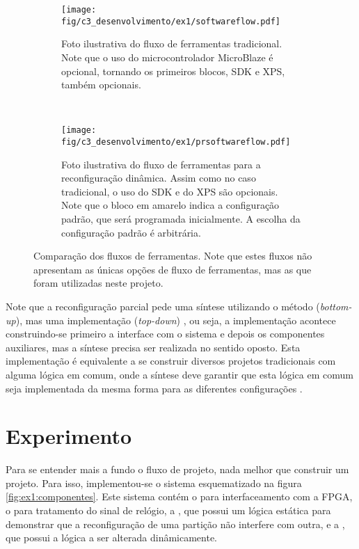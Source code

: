 \documentclass[11pt,a4paper,oneside]{book}
\begin{document}
\begin{figure}[h]
	\centering
       	\begin{subfigure}[b]{\textwidth}
       		\centering
		\texttt{[image: fig/c3\_desenvolvimento/ex1/softwareflow.pdf]}
		\caption{Foto ilustrativa do fluxo de ferramentas tradicional. Note que o uso do microcontrolador MicroBlaze é opcional, tornando os primeiros blocos, SDK e XPS, também opcionais.}
		\label{fig:ex1:softwareflow}
	\end{subfigure}\\
	\begin{subfigure}[b]{\textwidth}
		\centering
		\texttt{[image: fig/c3\_desenvolvimento/ex1/prsoftwareflow.pdf]}
		\caption{Foto ilustrativa do fluxo de ferramentas para a reconfiguração dinâmica. Assim como no caso tradicional, o uso do SDK e do XPS são opcionais. Note que o bloco em amarelo indica a configuração padrão, que será programada inicialmente. A escolha da configuração padrão é arbitrária.}
		\label{fig:ex1:prsoftwareflow}
	\end{subfigure}
	\caption{Comparação dos fluxos de ferramentas. Note que estes fluxos não apresentam as únicas opções de fluxo de ferramentas, mas as que foram utilizadas neste projeto.}
	\label{fig:ex1:softwareflow:comparacao}
\end{figure}

Note que a reconfiguração parcial pede uma síntese utilizando o método  (\textit{bottom-up}), mas uma implementação  (\textit{top-down}) \cite{ug743}, ou seja, a implementação acontece construindo-se primeiro a interface com o sistema e depois os componentes auxiliares, mas a síntese precisa ser realizada no sentido oposto.
Esta implementação é equivalente a se construir diversos projetos tradicionais com alguma lógica em comum, onde a síntese deve garantir que esta lógica em comum seja implementada da mesma forma para as diferentes configurações \cite{ug702}.

\section{Experimento}
Para se entender mais a fundo o fluxo de projeto, nada melhor que construir um projeto.
Para isso, implementou-se o sistema esquematizado na figura \ref{fig:ex1:componentes}.
Este sistema contém o  para interfaceamento com a FPGA, o  para tratamento do sinal de relógio, a , que possui um lógica estática para demonstrar que a reconfiguração de uma partição não interfere com outra, e a , que possui a lógica a ser alterada dinâmicamente.
\end{document}
